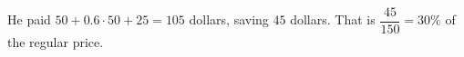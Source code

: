 He paid $50+0.6\cdot50+25=105$ dollars, saving $45$ dollars. That is $\dfrac{45}{150}=\boxed{30\%}$ of the regular price.
